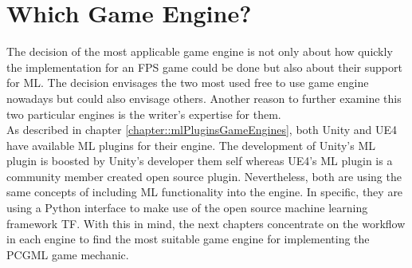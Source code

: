 \documentclass[MGS,Master,english]{twbook}%
\begin{document}
\section{Which Game Engine?}
The decision of the most applicable game engine is not only about how quickly the implementation for an FPS game could be done but also about their support for ML. The decision envisages the two most used free to use game engine nowadays but could also envisage others. Another reason to further examine this two particular engines is the writer's expertise for them.\\
As described in chapter \ref{chapter::mlPluginsGameEngines}, both Unity and UE4 have available ML plugins for their engine. The development of Unity's ML plugin is boosted by Unity's developer them self whereas UE4's ML plugin is a community member created open source plugin. Nevertheless, both are using the same concepts of including ML functionality into the engine. In specific, they are using a Python interface to make use of the open source machine learning framework \ac{TF}. With this in mind, the next chapters concentrate on the workflow in each engine to find the most suitable game engine for implementing the PCGML game mechanic.
\end{document}
